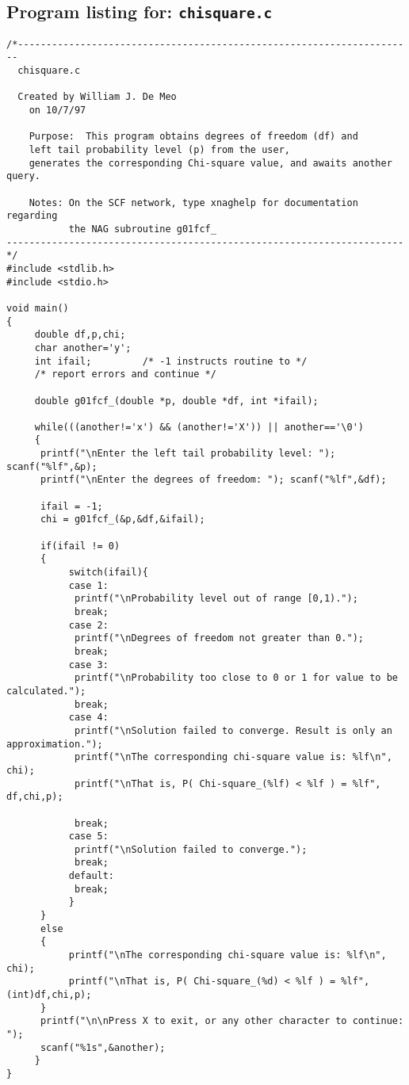 \documentclass{article}
\begin{document}
\subsection{Program listing for: {\tt chisquare.c}}
\begin{verbatim}
/*----------------------------------------------------------------------
  chisquare.c

  Created by William J. De Meo
    on 10/7/97

    Purpose:  This program obtains degrees of freedom (df) and 
    left tail probability level (p) from the user, 
    generates the corresponding Chi-square value, and awaits another query.

    Notes: On the SCF network, type xnaghelp for documentation regarding 
           the NAG subroutine g01fcf_
----------------------------------------------------------------------*/
#include <stdlib.h>
#include <stdio.h>

void main()
{
     double df,p,chi;
     char another='y';
     int ifail;			/* -1 instructs routine to */
     /* report errors and continue */

     double g01fcf_(double *p, double *df, int *ifail);

     while(((another!='x') && (another!='X')) || another=='\0')
     {
	  printf("\nEnter the left tail probability level: "); scanf("%lf",&p);
	  printf("\nEnter the degrees of freedom: "); scanf("%lf",&df);

	  ifail = -1;
	  chi = g01fcf_(&p,&df,&ifail);

	  if(ifail != 0)
	  {
	       switch(ifail){
	       case 1:
		    printf("\nProbability level out of range [0,1).");
		    break;
	       case 2:
		    printf("\nDegrees of freedom not greater than 0.");
		    break;
	       case 3:
		    printf("\nProbability too close to 0 or 1 for value to be calculated.");
		    break;
	       case 4:
		    printf("\nSolution failed to converge. Result is only an approximation.");
		    printf("\nThe corresponding chi-square value is: %lf\n", chi);
		    printf("\nThat is, P( Chi-square_(%lf) < %lf ) = %lf", df,chi,p);

		    break;
	       case 5:
		    printf("\nSolution failed to converge.");
		    break;
	       default:
		    break;
	       }
	  }
	  else
	  {
	       printf("\nThe corresponding chi-square value is: %lf\n", chi);
	       printf("\nThat is, P( Chi-square_(%d) < %lf ) = %lf", (int)df,chi,p);
	  }
	  printf("\n\nPress X to exit, or any other character to continue: ");
	  scanf("%1s",&another);
     }
}

\end{verbatim}
\end{document}
